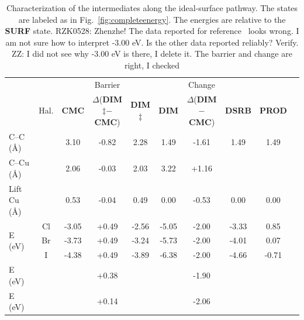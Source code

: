 \documentclass[%
 reprint,
 amsmath,amssymb,
 aps,
prb,
floatfix,
]{revtex4-2}
\newcommand{\zhzh}{\color{blue}}
\newcommand{\zhzh}{\color{blue}}
\newcommand{\comm}{\color{ForestGreen}} %
\begin{document}
\begin{table}
\centering
\caption{Characterization of the intermediates along the ideal-surface pathway. The states are labeled as in Fig.~\ref{fig:completeenergy}. The energies are relative to the \textbf{SURF} state.  %
{\comm RZK0528: Zhenzhe! The data reported for reference~\cite{pccp2010} looks wrong. I am not sure how to interpret -3.00 eV. Is the other data reported reliably? Verify. } {\zhzh ZZ: I did not see why -3.00 eV is there, I delete it. The barrier and change are right, I checked}
}
\label{table:idealsurface}
\begin{tabular}{ lccccccccc  }
 \hline
 \hline
  & & & Barrier & & & Change & &\\
  & Hal. & \textbf{CMC} & $\Delta$(\textbf{DIM$\ddagger$}$-$\textbf{CMC}) & \textbf{DIM$\ddagger$} & \textbf{DIM} & $\Delta$(\textbf{DIM}$-$\textbf{CMC}) & \textbf{DSRB} & \textbf{PROD} \\ 
 \hline 
 C--C (\si{\angstrom}) & & 3.10 & -0.82 & 2.28 & 1.49 & -1.61 & 1.49 & 1.49 \\ 
 \hline
 C--Cu (\si{\angstrom}) & & 2.06 & -0.03 & 2.03 & 3.22 & +1.16 & & \\
 \hline
 Lift Cu (\si{\angstrom}) & & 0.53 & -0.04 & 0.49 & 0.00 & -0.53 & 0.00 & 0.00 \\
 \hline
 \multirow{3}{*}{E (\si{\electronvolt}) } & Cl & -3.05 &+0.49 &-2.56 & -5.05 & -2.00& -3.33&0.85\\ 
 & Br & -3.73 &+0.49 & -3.24& -5.73 & -2.00& -4.01&0.07\\ 
 & I  & -4.38 & +0.49& -3.89& -6.38 & -2.00& -4.66&-0.71\\ 
 \hline
 E (\si{\electronvolt})~\cite{pccp2010} & &  & +0.38 & & & -1.90 & & \\
 \hline
 E (\si{\electronvolt})~\cite{jacs2013} & & & +0.14 & & & -2.06 & &\\
 \hline
 \hline
\end{tabular}
\end{table}
\end{document}
